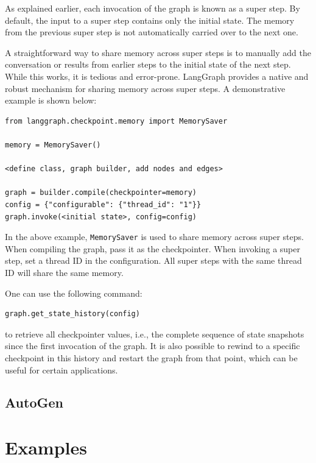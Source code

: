 As explained earlier, each invocation of the graph is known as a super step. By default, the input to a super step contains only the initial state. The memory from the previous super step is not automatically carried over to the next one. 

A straightforward way to share memory across super steps is to manually add the conversation or results from earlier steps to the initial state of the next step. While this works, it is tedious and error-prone. LangGraph provides a native and robust mechanism for sharing memory across super steps. A demonstrative example is shown below:
\begin{lstlisting}
from langgraph.checkpoint.memory import MemorySaver

memory = MemorySaver()

<define class, graph builder, add nodes and edges>

graph = builder.compile(checkpointer=memory)
config = {"configurable": {"thread_id": "1"}}
graph.invoke(<initial state>, config=config)
\end{lstlisting}

In the above example, \texttt{MemorySaver} is used to share memory across super steps. When compiling the graph, pass it as the checkpointer. When invoking a super step, set a thread ID in the configuration. All super steps with the same thread ID will share the same memory.

One can use the following command:
\begin{lstlisting}
graph.get_state_history(config)
\end{lstlisting}
to retrieve all checkpointer values, i.e., the complete sequence of state snapshots since the first invocation of the graph. It is also possible to rewind to a specific checkpoint in this history and restart the graph from that point, which can be useful for certain applications.



















\subsection{AutoGen}

\section{Examples}

